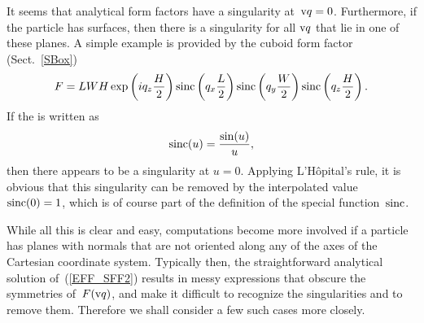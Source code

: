 %
It seems that  analytical form factors have a singularity at~$\text{v}{q}=0$.
Furthermore, if the particle has  surfaces,
then there is a singularity for all $\text{v}{q}$ that lie in one of these planes.
A simple example is provided by the cuboid form factor (Sect.~\ref{SBox})
\begin{equation}
F= L W H\exp\left(i q_z \frac{H}{2}\right) \operatorname{sinc}\left(q_x \frac{L}{2}\right)
\operatorname{sinc}\left(q_y \frac{W}{2}\right) \operatorname{sinc}\left(q_z \frac{H}{2}\right).
\end{equation}
If the  is written as
\begin{equation}
  \operatorname{sinc}(u) = \frac{\sin(u)}{u},
\end{equation}
then there appears to be a singularity at $u=0$.
Applying L'Hôpital's rule, it is obvious
that this singularity can be removed by the interpolated value
$\operatorname{sinc}(0)=1$,
which is of course part of the definition of the special function~$\operatorname{sinc}$.

While all this is clear and easy,
computations become more involved
if a particle has planes with normals that are not oriented along
any of the axes of the Cartesian coordinate system.
Typically then, the straightforward analytical solution of~(\ref{EFF_SFF2})
results in messy expressions that obscure the symmetries of~$F(\text{v}{q})$,
and make it difficult to recognize the singularities and
to remove them.
Therefore we shall consider a few such cases more closely.


\iffalse
\section{Special functions near the removable singularity}

\index{Machine epsilon}
We assume a double-precision machine epsilon
of $\epsilon=2^{-52}\simeq2.2\cdot10^{-16}$.

\section{Regular polyhedron}
\fi


